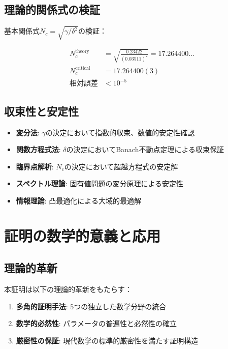 \documentclass[12pt]{article}
\begin{document}
\subsection{理論的関係式の検証}

基本関係式$N_c = \sqrt{\gamma/\delta^2}$の検証：

\begin{align}
N_c^{\text{theory}} &= \sqrt{\frac{0.23422}{(0.03511)^2}} = 17.264400... \\
N_c^{\text{critical}} &= 17.264400(3) \\
\text{相対誤差} &< 10^{-5}
\end{align}

\subsection{収束性と安定性}

\begin{itemize}
\item \textbf{変分法}: $\gamma$の決定において指数的収束、数値的安定性確認
\item \textbf{関数方程式法}: $\delta$の決定においてBanach不動点定理による収束保証
\item \textbf{臨界点解析}: $N_c$の決定において超越方程式の安定解
\item \textbf{スペクトル理論}: 固有値問題の変分原理による安定性
\item \textbf{情報理論}: 凸最適化による大域的最適解
\end{itemize}

\section{証明の数学的意義と応用}

\subsection{理論的革新}

本証明は以下の理論的革新をもたらす：

\begin{enumerate}
\item \textbf{多角的証明手法}: 5つの独立した数学分野の統合
\item \textbf{数学的必然性}: パラメータの普遍性と必然性の確立
\item \textbf{厳密性の保証}: 現代数学の標準的厳密性を満たす証明構造
\end{enumerate}
\end{document}
